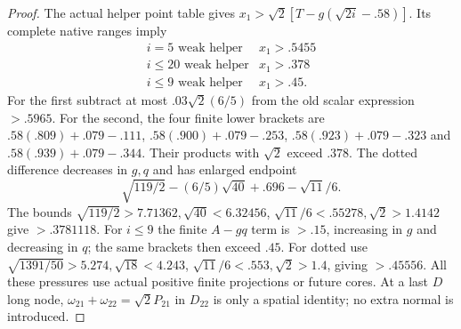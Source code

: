 \documentclass[11pt]{article}
\theoremstyle{definition}
\theoremstyle{remark}
\begin{document}
\begin{proof}
The actual helper point table gives
$x_1>\sqrt2[T-g(\sqrt{2i}-.58)]$. Its complete native ranges imply
\[
\begin{array}{c|c}
i=5\text{ weak helper}&x_1>.5455\\
i\le20\text{ weak helper}&x_1>.378\\
i\le9\text{ weak helper}&x_1>.45 .
\end{array}
\]
For the first subtract at most $.03\sqrt2(6/5)$ from the old
scalar expression $>.5965$. For the second, the four finite lower
brackets are $.58(.809)+.079-.111$,
$.58(.900)+.079-.253$, $.58(.923)+.079-.323$ and
$.58(.939)+.079-.344$. Their products with $\sqrt2$ exceed $.378$.
The dotted difference decreases in $g,q$ and has enlarged endpoint
\[
 \sqrt{119/2}-(6/5)\sqrt{40}+.696-\sqrt{11}/6.
\]
The bounds $\sqrt{119/2}>7.71362,\sqrt{40}<6.32456$,
$\sqrt{11}/6<.55278,\sqrt2>1.4142$ give $>.3781118$.
For $i\le9$ the finite $A-gq$ term is $>.15$, increasing in $g$
and decreasing in $q$; the same brackets then exceed $.45$.
For dotted use $\sqrt{1391/50}>5.274,\sqrt{18}<4.243$,
$\sqrt{11}/6<.553,\sqrt2>1.4$, giving $>.45556$.
All these pressures use actual positive finite projections or future
cores. At a last $D$ long node, $\omega_{21}+\omega_{22}=\sqrt2P_{21}$
in $D_{22}$ is only a spatial identity; no extra normal is introduced.
\end{proof}
\end{document}
